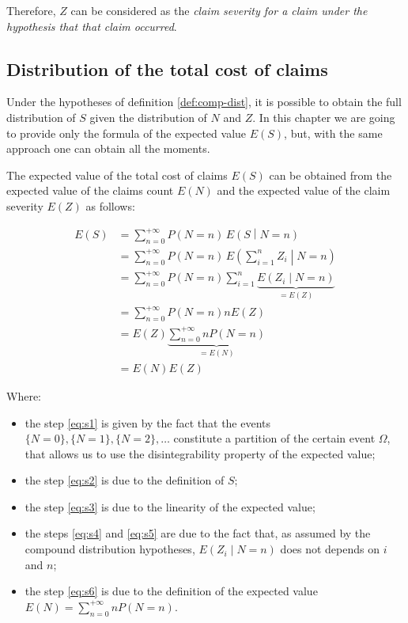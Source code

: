 \documentclass[a4paper, twoside, openright, 12pt]{report}
\providecommand{\tightlist}{%
  \setlength{\itemsep}{0pt}\setlength{\parskip}{0pt}}
\theoremstyle{definition}
\theoremstyle{definition}
\theoremstyle{definition}
\theoremstyle{remark}
\begin{document}
Therefore, \(Z\) can be considered as the \emph{claim severity for a claim under the hypothesis that that claim occurred}.

\hypertarget{chap:tcc-dist}{%
\subsection{Distribution of the total cost of claims}\label{chap:tcc-dist}}

Under the hypotheses of definition \ref{def:comp-dist}, it is possible to obtain the full distribution of \(S\) given the distribution of \(N\) and \(Z\). In this chapter we are going to provide only the formula of the expected value \(E(S)\), but, with the same approach one can obtain all the moments.

The expected value of the total cost of claims \(E(S)\) can be obtained from the expected value of the claims count \(E(N)\) and the expected value of the claim severity \(E(Z)\) as follows:

\begin{align}
\label{eq:s1}
E(S) & = \sum_{n=0}^{+\infty}{P(N=n) \, E\left(S \middle| N = n \right)}
\\ \label{eq:s2} & =
\sum_{n=0}^{+\infty}{P(N=n) \, E\left(\sum_{i=1}^{n}{Z_i} \middle| N = n \right)}
\\ \label{eq:s3} & =
\sum_{n=0}^{+\infty}{P(N=n) \sum_{i=1}^{n}{\underbrace{E\left( Z_i \middle| N = n \right)}_{=E(Z)}}}
\\ \label{eq:s4} & =
\sum_{n=0}^{+\infty}{P(N=n) n E(Z)}
\\ \label{eq:s5} & =
E(Z) \underbrace{\sum_{n=0}^{+\infty}{n P(N=n)}}_{=E(N)}
\\ \label{eq:s6} & =
E(N)E(Z)
\end{align}

Where:

\begin{itemize}
\tightlist
\item
  the step \eqref{eq:s1} is given by the fact that the events \(\{N=0\}, \{N=1\}, \{N=2\}, \dots\) constitute a partition of the certain event \(\Omega\), that allows us to use the disintegrability property of the expected value;
\item
  the step \eqref{eq:s2} is due to the definition of \(S\);
\item
  the step \eqref{eq:s3} is due to the linearity of the expected value;
\item
  the steps \eqref{eq:s4} and \eqref{eq:s5} are due to the fact that, as assumed by the compound distribution hypotheses, \(E\left( Z_i \middle| N = n \right)\) does not depends on \(i\) and \(n\);
\item
  the step \eqref{eq:s6} is due to the definition of the expected value \(E(N)=\sum_{n=0}^{+\infty}{n P(N=n)}\).
\end{itemize}
\end{document}
